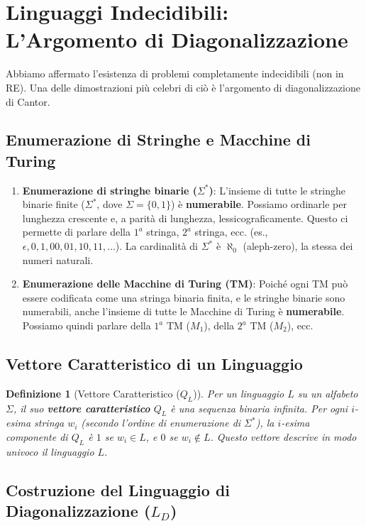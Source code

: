 \documentclass[a4paper]{article}
\newtheorem{definition}{Definizione}
\begin{document}
\section{Linguaggi Indecidibili: L'Argomento di Diagonalizzazione}

Abbiamo affermato l'esistenza di problemi completamente indecidibili (non in RE). Una delle dimostrazioni più celebri di ciò è l'argomento di diagonalizzazione di Cantor.

\subsection{Enumerazione di Stringhe e Macchine di Turing}

\begin{enumerate}
    \item \textbf{Enumerazione di stringhe binarie ($\Sigma^*$)}: L'insieme di tutte le stringhe binarie finite ($\Sigma^*$, dove $\Sigma = \{0,1\}$) è \textbf{numerabile}. Possiamo ordinarle per lunghezza crescente e, a parità di lunghezza, lessicograficamente. Questo ci permette di parlare della $1^{a}$ stringa, $2^{a}$ stringa, ecc. (es., $\epsilon, 0, 1, 00, 01, 10, 11, \dots$). La cardinalità di $\Sigma^*$ è $\aleph_0$ (aleph-zero), la stessa dei numeri naturali.
    \item \textbf{Enumerazione delle Macchine di Turing (TM)}: Poiché ogni TM può essere codificata come una stringa binaria finita, e le stringhe binarie sono numerabili, anche l'insieme di tutte le Macchine di Turing è \textbf{numerabile}. Possiamo quindi parlare della $1^{a}$ TM ($M_1$), della $2^{a}$ TM ($M_2$), ecc.
\end{enumerate}

\subsection{Vettore Caratteristico di un Linguaggio}

\begin{definition}[Vettore Caratteristico ($Q_L$)]
Per un linguaggio $L$ su un alfabeto $\Sigma$, il suo \textbf{vettore caratteristico} $Q_L$ è una sequenza binaria infinita. Per ogni $i$-esima stringa $w_i$ (secondo l'ordine di enumerazione di $\Sigma^*$), la $i$-esima componente di $Q_L$ è $1$ se $w_i \in L$, e $0$ se $w_i \notin L$. Questo vettore descrive in modo univoco il linguaggio $L$.
\end{definition}

\subsection{Costruzione del Linguaggio di Diagonalizzazione ($L_D$)}
\end{document}
